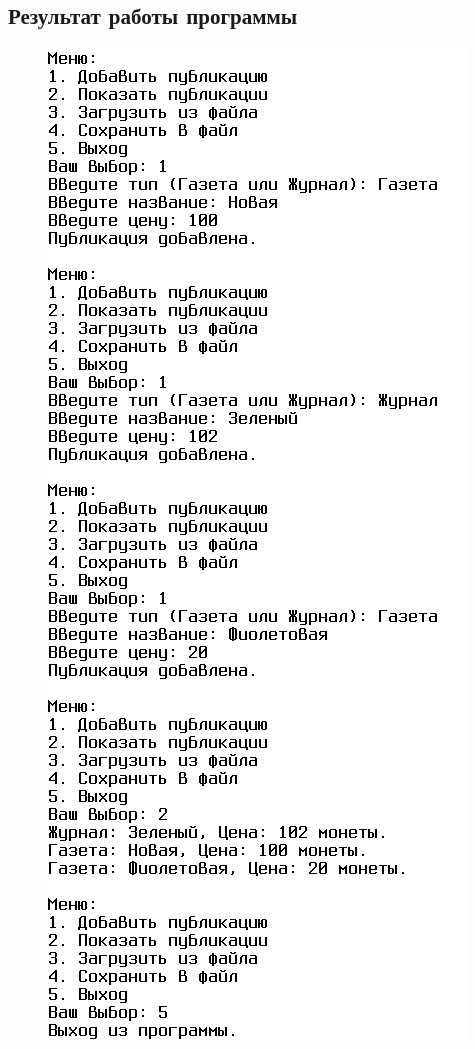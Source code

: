 \documentclass[14pt,a4paper]{article}
\begin{document}
\subsection{Результат работы программы}
\begin{figure}[h]
    \includegraphics[height=0.5\textheight]{data/demo16_2.png}
\end{figure}
\end{document}
